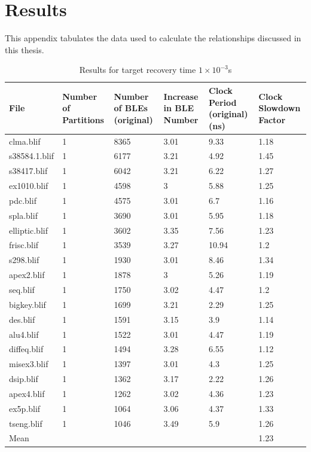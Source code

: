 \documentclass[12pt,final,oneside]{dwThesis} %
\begin{document}
   \appendix
   \chapter{Results}
   This appendix tabulates the data used to calculate the relationships discussed in this thesis.
   
      \begin{table}
      \footnotesize
      \begin{adjustwidth}{-1cm}{-1.2cm}
         \begin{tabularx}{1.1\textwidth}{XXXXXX}
            \toprule
            File & Number of Partitions &  Number of BLEs (original) &  Increase in BLE Number &  Clock Period (original) (ns) &  Clock Slowdown Factor\\
            \midrule
clma.blif & 1 & 8365 & 3.01 & 9.33 & 1.18\\
s38584.1.blif & 1 & 6177 & 3.21 & 4.92 & 1.45\\
s38417.blif & 1 & 6042 & 3.21 & 6.22 & 1.27\\
ex1010.blif & 1 & 4598 & 3 & 5.88 & 1.25\\
pdc.blif & 1 & 4575 & 3.01 & 6.7 & 1.16\\
spla.blif & 1 & 3690 & 3.01 & 5.95 & 1.18\\
elliptic.blif & 1 & 3602 & 3.35 & 7.56 & 1.23\\
frisc.blif & 1 & 3539 & 3.27 & 10.94 & 1.2\\
s298.blif & 1 & 1930 & 3.01 & 8.46 & 1.34\\
apex2.blif & 1 & 1878 & 3 & 5.26 & 1.19\\
seq.blif & 1 & 1750 & 3.02 & 4.47 & 1.2\\
bigkey.blif & 1 & 1699 & 3.21 & 2.29 & 1.25\\
des.blif & 1 & 1591 & 3.15 & 3.9 & 1.14\\
alu4.blif & 1 & 1522 & 3.01 & 4.47 & 1.19\\
diffeq.blif & 1 & 1494 & 3.28 & 6.55 & 1.12\\
misex3.blif & 1 & 1397 & 3.01 & 4.3 & 1.25\\
dsip.blif & 1 & 1362 & 3.17 & 2.22 & 1.26\\
apex4.blif & 1 & 1262 & 3.02 & 4.36 & 1.23\\
ex5p.blif & 1 & 1064 & 3.06 & 4.37 & 1.33\\
tseng.blif & 1 & 1046 & 3.49 & 5.9 & 1.26\\
Mean &         &           &        &          & 1.23\\
\bottomrule
         \end{tabularx}
         \caption{Results for target recovery time $1\times10^{-3}$s}
         \label{Results1e-3}
      \end{adjustwidth}
   \end{table}
   
\end{document}

